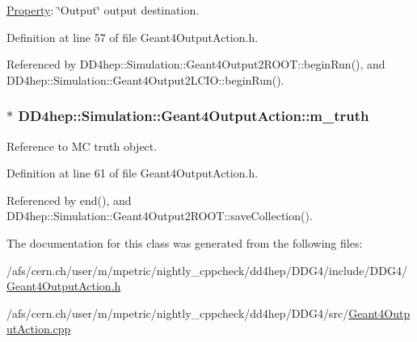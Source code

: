 \hyperlink{class_d_d4hep_1_1_property}{Property}: \char`\"{}Output\char`\"{} output destination. 

Definition at line 57 of file Geant4OutputAction.h.

Referenced by DD4hep::Simulation::Geant4Output2ROOT::beginRun(), and DD4hep::Simulation::Geant4Output2LCIO::beginRun().\hypertarget{class_d_d4hep_1_1_simulation_1_1_geant4_output_action_ac2c6fd898ae2b43b9742cd0fb36d31c1}{
\subsubsection[{m\_\-truth}]{$\ast$ {\bf DD4hep::Simulation::Geant4OutputAction::m\_\-truth}}}
\label{class_d_d4hep_1_1_simulation_1_1_geant4_output_action_ac2c6fd898ae2b43b9742cd0fb36d31c1}


Reference to MC truth object. 

Definition at line 61 of file Geant4OutputAction.h.

Referenced by end(), and DD4hep::Simulation::Geant4Output2ROOT::saveCollection().

The documentation for this class was generated from the following files:\begin{DoxyCompactItemize}
\item 
/afs/cern.ch/user/m/mpetric/nightly\_\-cppcheck/dd4hep/DDG4/include/DDG4/\hyperlink{_geant4_output_action_8h}{Geant4OutputAction.h}\item 
/afs/cern.ch/user/m/mpetric/nightly\_\-cppcheck/dd4hep/DDG4/src/\hyperlink{_geant4_output_action_8cpp}{Geant4OutputAction.cpp}\end{DoxyCompactItemize}

